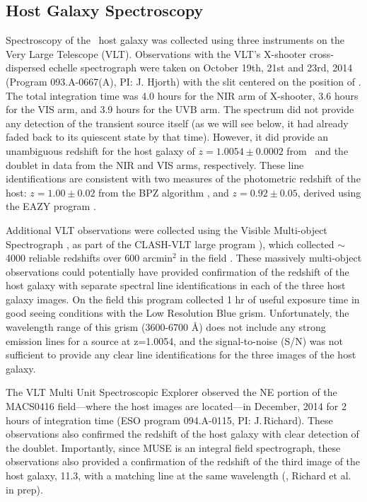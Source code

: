 \subsection{Host Galaxy Spectroscopy}\label{sec:Spectroscopy}

Spectroscopy of the \spock\ host galaxy was collected using three
instruments on the Very Large Telescope (VLT).  Observations with the
VLT's X-shooter cross-dispersed echelle spectrograph
\citep{Vernet:2011} were taken on October 19th, 21st and 23rd, 2014
(Program 093.A-0667(A), PI: J. Hjorth) with the slit centered on the
position of \spocktwo.  The total integration time was 4.0 hours for the
NIR arm of X-shooter, 3.6 hours for the VIS arm, and 3.9 hours for the
UVB arm.  The spectrum did not provide any detection of the transient
source itself (as we will see below, it had already faded back to its
quiescent state by that time).  However, it did provide an unambiguous
redshift for the host galaxy of $z=1.0054\pm0.0002$ from \Ha\ and the
 doublet in data from the NIR and VIS arms,
respectively.  These line identifications are consistent with two
measures of the photometric redshift of the host: $z=1.00\pm0.02$ from
the BPZ algorithm \citep{Benitez:2000}, and $z=0.92\pm0.05$, derived
using the EAZY program \citep{Brammer:2008}.

Additional VLT observations were collected using the Visible
Multi-object Spectrograph \citep[VIMOS][]{LeFevre:2003}, as part of
the CLASH-VLT large program \citep[Program 186.A-0.798; P.I.:
  P. Rosati;][]{Rosati:2014}), which collected $\sim$4000 reliable
redshifts over 600 arcmin$^2$ in the  field
\citep{Grillo:2015a,Balestra:2015}.  These massively multi-object
observations could potentially have provided confirmation of the
redshift of the \spock host galaxy with separate spectral line
identifications in each of the three host galaxy images.  On the
 field this program collected 1 hr of useful exposure time in
good seeing conditions with the Low Resolution Blue grism.
Unfortunately, the wavelength range of this grism (3600-6700 \AA) does
not include any strong emission lines for a source at z=1.0054, and
the signal-to-noise (S/N) was not sufficient to provide any clear line
identifications for the three images of the \spock host galaxy.

The VLT Multi Unit Spectroscopic Explorer
\citep[MUSE;][]{Henault:2003,Bacon:2012} observed the NE portion of
the MACS0416 field---where the \spock host images are located---in
December, 2014 for 2 hours of integration time (ESO program
094.A-0115, PI: J.\,Richard).  These observations also confirmed the
redshift of the host galaxy with clear detection of the
 doublet.  Importantly, since MUSE is an integral
field spectrograph, these observations also provided a confirmation of
the redshift of the third image of the host galaxy, 11.3, with a
matching  line at the same wavelength
(\citealt{Caminha:2016}, Richard et al. in prep).

